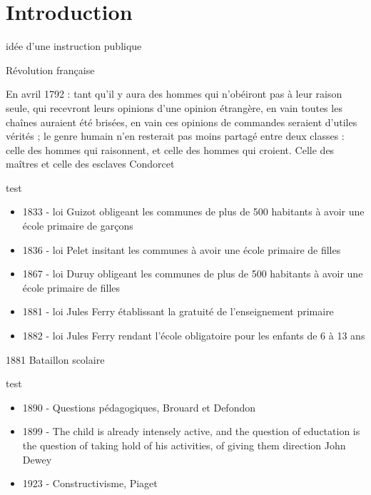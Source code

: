 
\section{Introduction}

\begin{frame}{idée d'une instruction publique}

Révolution française

En avril 1792 :
\og{}tant qu'il y aura des hommes qui n'obéiront pas à leur raison seule, 
qui recevront leurs opinions d'une opinion étrangère, en vain toutes 
les chaînes auraient été brisées, en vain ces opinions de commandes 
seraient d'utiles vérités ; le genre humain n'en resterait pas moins 
partagé entre deux classes : celle des hommes qui raisonnent, et celle 
des hommes qui croient. Celle des maîtres et celle des esclaves\fg{}
Condorcet

\end{frame}

\begin{frame}{test}
\begin{itemize}
\item 1833 - loi Guizot obligeant les communes de plus de 500 habitants 
    à avoir une école primaire de garçons
\item 1836 - loi Pelet insitant les communes à avoir une école primaire de filles
\item 1867 - loi Duruy obligeant les communes de plus de 500 habitants 
à avoir une école primaire de filles
\item 1881 - loi Jules Ferry établissant la gratuité de l'enseignement primaire
\item 1882 - loi Jules Ferry rendant l'école obligatoire pour les enfants de 6 à 13 ans
\end{itemize}

\end{frame}

\begin{frame}{1881 Bataillon scolaire}
\end{frame}

\begin{frame}{test}
  \begin{itemize}
  \item 1890 - Questions pédagogiques, Brouard et Defondon
  \item 1899 - \og{}The child is already intensely active, and the question 
  of eductation is the question of taking hold of his activities, of 
  giving them direction\fg{} John Dewey
  \item 1923 - Constructivisme, Piaget
  \end{itemize}
  
\end{frame}


